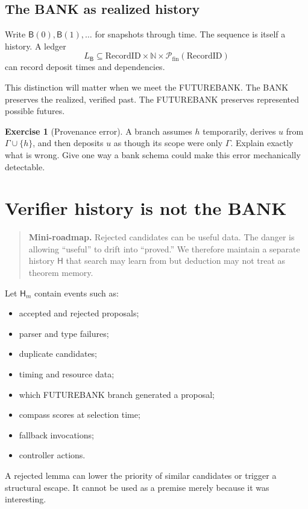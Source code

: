 \documentclass[11pt,openany]{book}
\theoremstyle{definition}
\newtheorem{exercise}[theorem]{Exercise}
\theoremstyle{remark}
\newenvironment{miniroadmap}{\begin{quote}\small\color{deepblue}\textbf{Mini-roadmap.} }{\end{quote}}
\newcommand{\Bank}{\mathsf{B}}
\newcommand{\Hist}{\mathsf{H}}
\newcommand{\N}{\mathbb{N}}
\begin{document}
\section{The BANK as realized history}
Write $\Bank(0),\Bank(1),\ldots$ for snapshots through time. The sequence is itself a history. A ledger
\[
L_{\Bank}\subseteq \mathrm{RecordID}\times\N\times\mathcal P_{\mathrm{fin}}(\mathrm{RecordID})
\]
can record deposit times and dependencies.

This distinction will matter when we meet the FUTUREBANK. The BANK preserves the realized, verified past. The FUTUREBANK preserves represented possible futures.

\begin{exercise}[Provenance error]\label{ex:scope}
A branch assumes $h$ temporarily, derives $u$ from $\Gamma\cup\{h\}$, and then deposits $u$ as though its scope were only $\Gamma$. Explain exactly what is wrong. Give one way a bank schema could make this error mechanically detectable.
\end{exercise}

\chapter{Verifier history is not the BANK}
\begin{miniroadmap}
Rejected candidates can be useful data. The danger is allowing ``useful'' to drift into ``proved.'' We therefore maintain a separate history $\Hist$ that search may learn from but deduction may not treat as theorem memory.
\end{miniroadmap}

Let $\Hist_m$ contain events such as:
\begin{itemize}
\item accepted and rejected proposals;
\item parser and type failures;
\item duplicate candidates;
\item timing and resource data;
\item which FUTUREBANK branch generated a proposal;
\item compass scores at selection time;
\item fallback invocations;
\item controller actions.
\end{itemize}
A rejected lemma can lower the priority of similar candidates or trigger a structural escape. It cannot be used as a premise merely because it was interesting.
\end{document}
